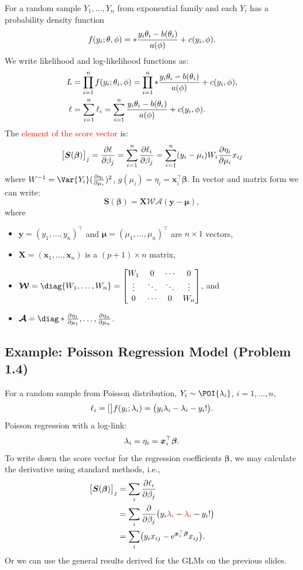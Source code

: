 \documentclass{article}\usepackage[]{graphicx}\usepackage[svgnames]{xcolor}
\let\exp\relax%
\let\log\relax%
\providecommand{\Vector}[1]{\bm{#1}}%
\providecommand{\Matrix}[1]{\bm{#1}}
\providecommand{\MatrixCal}[1]{\bm{\mathcal{#1}}}
\begin{document}
For a random sample $ Y_1,\ldots,Y_n $ from exponential family and each $ Y_i $ has a probability density function
\[ f(y_i;\theta,\phi)=\exp*{\frac{y_i\theta_i-b(\theta_i)}{a(\phi)}+c(y_i,\phi)}. \]
We write likelihood and log-likelihood functions as:
\begin{align*}
    L    & =\prod_{i=1}^n f(y_i;\theta_i,\phi)=\prod_{i=1}^n\exp*{\frac{y_i\theta_i-b(\theta_i)}{a(\phi)}+c(y_i,\phi)}, \\
    \ell & =\sum_{i=1}^{n} \ell_i=\sum_{i=1}^{n}\frac{y_i\theta_i-b(\theta_i)}{a(\phi)}+c(y_i,\phi).
\end{align*}
The \textcolor{Red}{element of the score vector} is:
\[ \bigl[\Vector{S}(\Vector{\beta})\bigr]_j=\pdv{\ell}{\beta_j}=\sum_{i=1}^{n} \pdv{\ell_i}{\beta_j}=\sum_{i=1}^{n} (y_i-\mu_i)W_i\pdv{\eta_i}{\mu_i}x_{ij} \]
where $  W^{-1}=\Var{Y_i}(\pdv{\eta_i}{\mu_i})^2 $, $ g(\mu_i)=\eta_i=\Vector{x}_i^\top \Vector{\beta} $. In vector and matrix form we can write:
\[ \Vector{S}(\Vector{\beta})=\Matrix{X}\MatrixCal{W}\MatrixCal{A}(\Vector{y}-\Vector{\mu}), \]
where
\begin{itemize}
    \item $ \Vector{y}=(y_1,\ldots,y_n)^\top $ and $ \Vector{\mu}=(\mu_1,\ldots,\mu_n)^\top $ are $ n\times 1 $ vectors,
    \item $ \Matrix{X}=(\Vector{x}_1,\ldots,\Vector{x}_n) $ is a $ (p+1)\times n $ matrix,
    \item $ \MatrixCal{W}=\diag{W_1,\ldots,W_n}=\begin{bmatrix}
                  W_1    & 0      & \cdots & 0      \\
                  \vdots & \ddots & \ddots & \vdots \\
                  0      & \cdots & 0      & W_n
              \end{bmatrix} $, and
    \item $ \MatrixCal{A}=\diag*{\pdv{\eta_1}{\mu_1},\ldots,\pdv{\eta_n}{\mu_n}} $.
\end{itemize}
\subsection*{Example: Poisson Regression Model (Problem 1.4)}
For a random sample from Poisson distribution, $ Y_i \sim \POI{\lambda_i} $, $ i=1,\ldots,n $,
\[ \ell_i=\log[\big]{f(y_i;\lambda_i)}=\bigl(y_i\log{\lambda_i}-\lambda_i-\log{y_i!}\bigr). \]
Poisson regression with a log-link:
\[ \log{\lambda_i}=\eta_i=\Vector{x}_i^\top \Vector{\beta}. \]
To write down the score vector for the regression coefficients $ \Vector{\beta} $, we may
calculate the derivative using standard methods, i.e.,
\begin{align*}
    \bigl[\Vector{S}(\Vector{\beta})\bigr]_j
     & =\sum_i \pdv{\ell_i}{\beta_j}                                                                                  \\
     & =\sum_i \pdv*{\bigl(y_i \textcolor{Red}{\log{\lambda_i}}-\textcolor{Red}{\lambda_i}-\log{y_i!}\bigr)}{\beta_j} \\
     & =\sum_i\bigl(y_i x_{ij}-\mathrm{e}^{\Vector{x}_i^\top \Vector{\beta}}x_{ij}\bigr).
\end{align*}
Or we can use the general results derived for the GLMs on the previous slides.
\end{document}
